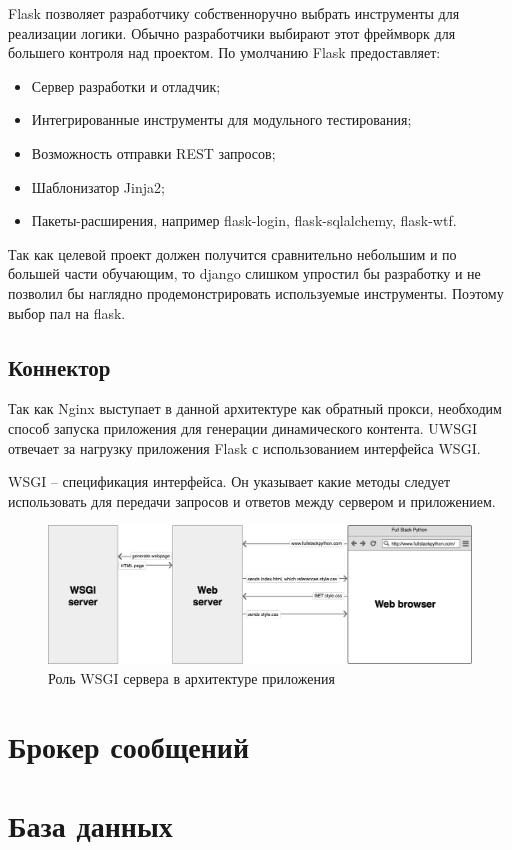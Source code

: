 Flask позволяет разработчику собственноручно выбрать инструменты для реализации
логики. Обычно разработчики выбирают этот фреймворк для большего контроля над
проектом. По умолчанию Flask предоставляет:
\begin{itemize}
    \item Сервер разработки и отладчик;
    \item Интегрированные инструменты для модульного тестирования;
    \item Возможность отправки REST запросов;
    \item Шаблонизатор Jinja2;
    \item Пакеты-расширения, например flask-login, flask-sqlalchemy, flask-wtf.
\end{itemize}

Так как целевой проект должен получится сравнительно небольшим и по большей
части обучающим, то django слишком упростил бы разработку и не позволил бы
наглядно продемонстрировать используемые инструменты. Поэтому выбор пал на
flask.

\subsection{Коннектор}
Так как Nginx выступает в данной архитектуре как обратный прокси, необходим
способ запуска приложения для генерации динамического контента. UWSGI отвечает
за нагрузку приложения Flask с использованием интерфейса WSGI.

WSGI -- спецификация интерфейса. Он указывает какие методы следует использовать
для передачи запросов и ответов между сервером и приложением.

\begin{figure}[H]
    \centering
    \includegraphics[scale=0.35]{inc/img/web-browser-server-wsgi.png}
    \caption{Роль WSGI сервера в архитектуре приложения}
\end{figure}

\section{Брокер сообщений}
\section{База данных}

